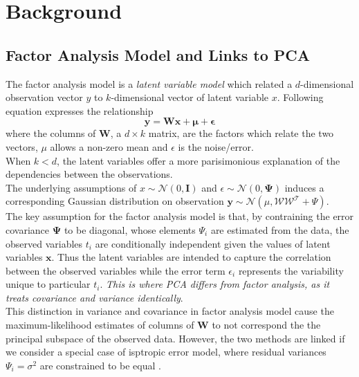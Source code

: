 \chapter{Background}
\section{Factor Analysis Model and Links to PCA}
The factor analysis model is a \emph{latent variable model} which related a $d$-dimensional observation vector $y$ to $k$-dimensional vector of latent variable $x$. Following equation expresses the relationship 
\begin{equation}
\mathbf{y = Wx + \mu + \epsilon}
\end{equation}
where the columns of $\mathbf{W}$, a $d\times k$ matrix, are the factors which relate the two vectors, $\mu$ allows a non-zero mean and $\epsilon$ is the noise/error. \\
When $k < d$, the latent variables offer a more parisimonious explanation of the dependencies between the observations. \\
The underlying assumptions of $x \sim \mathcal{N}(0, \mathbf{I})$  and $\epsilon \sim \mathcal{N}(0, \mathbf{ \Psi })$ induces a corresponding Gaussian distribution on observation $\mathbf{y} \sim \mathcal{N}(\mathcal{\mu}, \mathcal{WW^T} + \Psi)$. \\
The key assumption for the factor analysis model is that, by contraining the error  covariance $\mathbf{\Psi}$ to be diagonal, whose elements $\Psi_i$ are estimated from the data, the observed variables $t_i$ are conditionally independent given the values of latent variables $\mathbf{x}$. Thus the latent variables are intended to capture the correlation between the observed variables while the error term $\epsilon_i$ represents the variability unique to particular $t_i$. \emph{This is where PCA differs from factor analysis, as it treats covariance and variance identically}.\\
This distinction in variance and covariance in factor analysis model cause the maximum-likelihood estimates of columns of $\mathbf{W}$ to not correspond the the principal subspace of the observed data. However, the two methods are linked if we consider a special case of isptropic error model, where residual variances $\Psi_i = \sigma^2$ are constrained to be equal \cite{Factor}.\\\\

